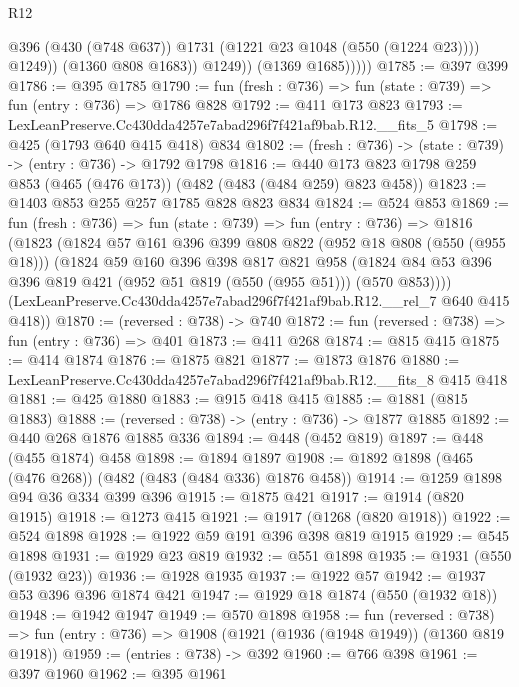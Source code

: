 \begin{lexlean}{R12}
\begin{coremodule}
                        @396
                        (@430 (@748 @637))
                        @1731
                        (@1221 @23 @1048 (@550 (@1224 @23))))
                      @1249))
                  (@1360 @808 @1683))
                @1249))
            (@1369 @1685)))))
@1785 := @397 @399
@1786 := @395 @1785
@1790 := fun (fresh : @736) => fun (state : @739) => fun (entry : @736) => @1786 @828
@1792 := @411 @173 @823
@1793 := LexLeanPreserve.Cc430dda4257e7abad296f7f421af9bab.R12.__fits_5
@1798 := @425 (@1793 @640 @415 @418) @834
@1802 := (fresh : @736) -> (state : @739) -> (entry : @736) -> @1792 @1798
@1816 := @440 @173 @823 @1798 @259 @853 (@465 (@476 @173)) (@482 (@483 (@484 @259) @823 @458))
@1823 := @1403 @853 @255 @257 @1785 @828 @823 @834
@1824 := @524 @853
@1869 := fun (fresh : @736) =>
  fun (state : @739) =>
  fun (entry : @736) =>
  @1816
    (@1823
      (@1824
        @57
        @161
        @396
        @399
        @808
        @822
        (@952 @18 @808 (@550 (@955 @18)))
        (@1824
          @59
          @160
          @396
          @398
          @817
          @821
          @958
          (@1824 @84 @53 @396 @396 @819 @421 (@952 @51 @819 (@550 (@955 @51))) (@570 @853))))
      (LexLeanPreserve.Cc430dda4257e7abad296f7f421af9bab.R12.__rel_7 @640 @415 @418))
@1870 := (reversed : @738) -> @740
@1872 := fun (reversed : @738) => fun (entry : @736) => @401
@1873 := @411 @268
@1874 := @815 @415
@1875 := @414 @1874
@1876 := @1875 @821
@1877 := @1873 @1876
@1880 := LexLeanPreserve.Cc430dda4257e7abad296f7f421af9bab.R12.__fits_8 @415 @418
@1881 := @425 @1880
@1883 := @915 @418 @415
@1885 := @1881 (@815 @1883)
@1888 := (reversed : @738) -> (entry : @736) -> @1877 @1885
@1892 := @440 @268 @1876 @1885 @336
@1894 := @448 (@452 @819)
@1897 := @448 (@455 @1874) @458
@1898 := @1894 @1897
@1908 := @1892 @1898 (@465 (@476 @268)) (@482 (@483 (@484 @336) @1876 @458))
@1914 := @1259 @1898 @94 @36 @334 @399 @396
@1915 := @1875 @421
@1917 := @1914 (@820 @1915)
@1918 := @1273 @415
@1921 := @1917 (@1268 (@820 @1918))
@1922 := @524 @1898
@1928 := @1922 @59 @191 @396 @398 @819 @1915
@1929 := @545 @1898
@1931 := @1929 @23 @819
@1932 := @551 @1898
@1935 := @1931 (@550 (@1932 @23))
@1936 := @1928 @1935
@1937 := @1922 @57
@1942 := @1937 @53 @396 @396 @1874 @421
@1947 := @1929 @18 @1874 (@550 (@1932 @18))
@1948 := @1942 @1947
@1949 := @570 @1898
@1958 := fun (reversed : @738) =>
  fun (entry : @736) => @1908 (@1921 (@1936 (@1948 @1949)) (@1360 @819 @1918))
@1959 := (entries : @738) -> @392
@1960 := @766 @398
@1961 := @397 @1960
@1962 := @395 @1961

\end{coremodule}
\end{lexlean}
